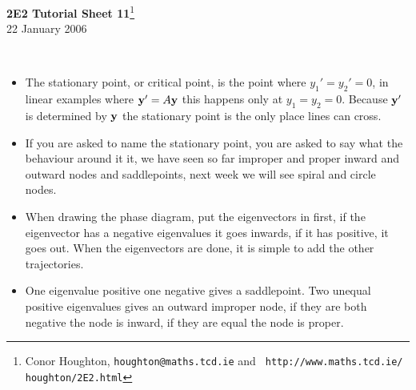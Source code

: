 \documentclass[12pt]{article}
\begin{document}
\begin{center}
{\bf 2E2 Tutorial Sheet 11}\footnote{Conor
Houghton, {\tt houghton@maths.tcd.ie} and {\tt
http://www.maths.tcd.ie/ houghton/2E2.html}}
\\[1cm]
 22 January 2006
\end{center}
{
\\ 
\begin{itemize}
\item The stationary point, or critical point, is the
point where $y_1'=y_2'=0$, in linear examples where ${\bf y}'=A{\bf
y}$ this happens only at $y_1=y_2=0$. Because ${\bf y}'$ is determined
by ${\bf y}$ the stationary point is the only place lines can
cross. 
\item If you are asked to name the stationary point, you are asked to
say what the behaviour around it it, we have seen so far improper and
proper inward and outward nodes and saddlepoints, next week we will
see spiral and circle nodes. 
\item When drawing the phase diagram, put the eigenvectors in first,
if the eigenvector has a negative eigenvalues it goes inwards, if it
has positive, it goes out. When the eigenvectors are done, it is
simple to add the other trajectories.
\item One eigenvalue positive one negative gives a saddlepoint. Two unequal positive eigenvalues gives an outward improper node, if they are both negative the node is inward, if they are equal the node is proper.
\end{itemize}
\newpage
{}
}
\end{document}
